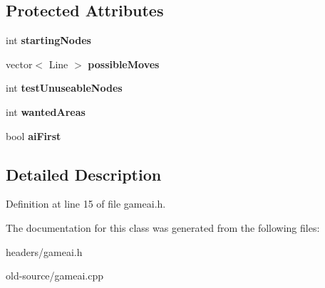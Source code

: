 \subsection*{Protected Attributes}
\begin{DoxyCompactItemize}
\item 
\hypertarget{classGameAI_a50568e8c64c0a8f3f6c54f26acc13d99}{int {\bfseries starting\+Nodes}}\label{classGameAI_a50568e8c64c0a8f3f6c54f26acc13d99}

\item 
\hypertarget{classGameAI_a24a47307a58f64a84b62645b449df9bd}{vector$<$ Line $>$ {\bfseries possible\+Moves}}\label{classGameAI_a24a47307a58f64a84b62645b449df9bd}

\item 
\hypertarget{classGameAI_a8b76334b18d881864e744fe903685d62}{int {\bfseries test\+Unuseable\+Nodes}}\label{classGameAI_a8b76334b18d881864e744fe903685d62}

\item 
\hypertarget{classGameAI_ac81540eb7691f8e2f69f36e533c65125}{int {\bfseries wanted\+Areas}}\label{classGameAI_ac81540eb7691f8e2f69f36e533c65125}

\item 
\hypertarget{classGameAI_adbcfaf523749716aabb2a623d519f309}{bool {\bfseries ai\+First}}\label{classGameAI_adbcfaf523749716aabb2a623d519f309}

\end{DoxyCompactItemize}


\subsection{Detailed Description}


Definition at line 15 of file gameai.\+h.



The documentation for this class was generated from the following files\+:\begin{DoxyCompactItemize}
\item 
headers/gameai.\+h\item 
old-\/source/gameai.\+cpp\end{DoxyCompactItemize}
